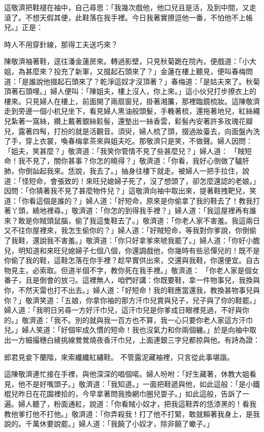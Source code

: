 這敬濟把鞋褪在袖中，自己尋思：「我幾次戲他，他口兒且是活，及到中間，又走滾了。不想天假其便，此鞋落在我手裡。今日我著實撩逗他一番，不怕他不上帳兒。」正是：

時人不用穿針線，那得工夫送巧來？

陳敬濟袖著鞋，逕往潘金蓮房來。轉過影壁，只見秋菊跪在院內，便戲道：「小大姐，為甚麼來？投充了新軍，又掇起石頭來了？」金蓮在樓上聽見，便叫春梅問道：「是誰說他掇起石頭來了？乾淨這奴才沒頂著？」春梅道：「是姑夫來了。秋菊頂著石頭哩。」婦人便叫：「陳姐夫，樓上沒人，你上來。」這小伙兒打步撩衣上的樓來。只見婦人在樓上，前面開了兩扇窗兒，掛著湘簾，那裡臨鏡梳妝。這陳敬濟走到旁邊一個小杌兒坐下，看見婦人黑油般頭髮，手輓著梳，還拖著地兒，紅絲繩兒紮著一窩絲，纘上戴著銀絲鬏髻，還墊出一絲香雲，鬏髻內安著許多玫瑰花瓣兒，露著四髩，打扮的就是活觀音。須臾，婦人梳了頭，掇過妝臺去，向面盤內洗了手，穿上衣裳，喚春梅拿茶來與姐夫吃。那敬濟只是笑，不做聲。婦人因問：「姐夫，笑甚麼？」敬濟道：「我笑你管情不見了些甚麼兒？」婦人道： 「賊短命！我不見了，關你甚事？你怎的曉得？」敬濟道：「你看，我好心倒做了驢肝肺，你倒訕起我來。恁說，我去了。」抽身往樓下就走。被婦人一把手拉住，說道：「怪短命，會張致的！來旺兒媳婦子死了，沒了想頭了，卻怎麼還認的老娘。」因問：「你猜著我不見了甚麼物件兒？」這敬濟向袖中取出來，提著鞋拽靶兒，笑道：「你看這個是誰的？」婦人道：「好短命，原來是你偷拿了我的鞋去了！教我打著丫頭，繞地裡尋。」敬濟道：「你怎的到得我手裡？」婦人道：「我這屋裡再有誰來？敢是你賊頭鼠腦，偷了我這隻鞋去了。」敬濟道：「你老人家不害羞。我這兩日又不往你屋裡來，我怎生偷你的？」婦人道：「好賊短命，等我對你爹說，你倒偷了我鞋，還說我不害羞。」敬濟道：「你只好拿爹來唬我罷了。」婦人道：「你好小膽兒，明知道和來旺兒媳婦子七個八個，你還調戲他，你幾時有些忌憚兒的！既不是你偷了我的鞋，這鞋怎落在你手裡？趁早實供出來，交還與我鞋，你還便宜。自古物見主，必索取。但道半個不字，教你死在我手裡。」敬濟道： 「你老人家是個女番子，且是倒會的放刁。這裡無人，咱們好講：你既要鞋，拿一件物事兒，我換與你，不然天雷也打不出去。」婦人道：「好短命！我的鞋應當還我，教換甚物事兒與你？」敬濟笑道：「五娘，你拿你袖的那方汗巾兒賞與兒子，兒子與了你的鞋罷。」婦人道：「我明日另尋一方好汗巾兒，這汗巾兒是你爹成日眼裡見過，不好與你的。」敬濟道：「我不。別的就與我一百方也不算，我一心只要你老人家這方汗巾兒。」婦人笑道：「好個牢成久慣的短命！我也沒氣力和你兩個纏。」於是向袖中取出一方細撮穗白綾挑線鶯鶯燒夜香汗巾兒，上面連銀三字兒都掠與他。有詩為證：

郎君見妾下蘭階，來索纖纖紅繡鞋。
不管露泥藏袖裡，只言從此事堪諧。

這陳敬濟連忙接在手裡，與他深深的唱個喏。婦人吩咐：「好生藏著，休教大姐看見，他不是好嘴頭子。」敬濟道：「我知道。」一面把鞋遞與他，如此這般：「是小鐵棍兒昨日在花園裡拾的，今早拿著問我換網巾圈兒耍子。」如此這般，告訴了一遍。婦人聽了，粉面通紅，說道：「你看賊小奴才，把我這鞋弄的恁漆黑的！看我教他爹打他不打他。」敬濟道：「你弄殺我！打了他不打緊，敢就賴著我身上，是我說的。千萬休要說罷。」婦人道：「我饒了小奴才，除非饒了蠍子。」

